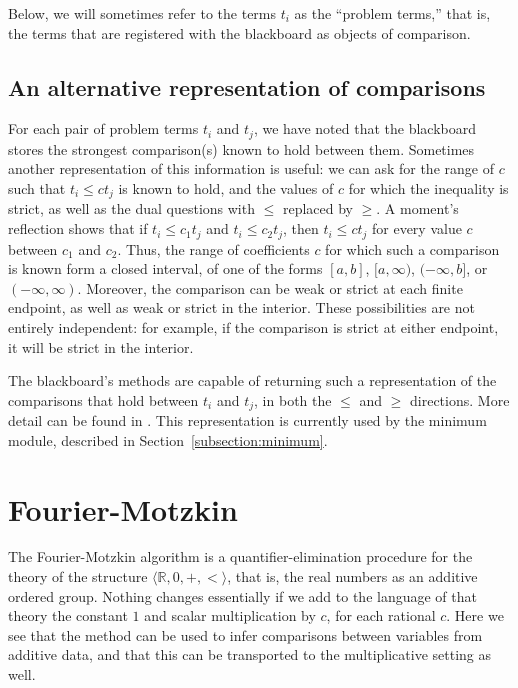 \documentclass[runningheds]{llncs}
\newcommand{\RR}{\mathbb{R}}
\begin{document}
Below, we will sometimes refer to the terms $t_i$ as the ``problem terms,'' that is, the terms that are registered with the blackboard as objects of comparison.

\subsection{An alternative representation of comparisons}
\label{subsection:alternative:representation}

For each pair of problem terms $t_i$ and $t_j$, we have noted that the blackboard stores the strongest comparison(s) known to hold between them. Sometimes another representation of this information is useful: we can ask for the range of $c$ such that $t_i \leq c t_j$ is known to hold, and the values of $c$ for which the inequality is strict, as well as the dual questions with $\le$ replaced by $\ge$. A moment's reflection shows that if $t_i \leq c_1 t_j$ and $t_i \leq c_2 t_j$, then $t_i \leq c t_j$ for every value $c$ between $c_1$ and $c_2$. Thus, the range of coefficients $c$ for which such a comparison is known form a closed interval, of one of the forms $[a, b]$, $[a, \infty)$, $(-\infty, b]$, or $(-\infty, \infty)$. Moreover, the comparison can be weak or strict at each finite endpoint, as well as weak or strict in the interior. These possibilities are not entirely independent: for example, if the comparison is strict at either endpoint, it will be strict in the interior.

The blackboard's methods are capable of returning such a representation of the comparisons that hold between $t_i$ and $t_j$, in both the $\le$ and $\ge$ directions. More detail can be found in \cite{lewis:14}. This representation is currently used by the minimum module, described in Section~\ref{subsection:minimum}. 



\section{Fourier-Motzkin}
\label{section:fourier:motzkin}

The Fourier-Motzkin algorithm \cite{schrijver:86} is a quantifier-elimination procedure for the theory of the structure $\langle \RR, 0, +, < \rangle$, that is, the real numbers as an additive ordered group. Nothing changes essentially if we add to the language of that theory the constant $1$ and scalar multiplication by $c$, for each rational $c$. Here we see that the method can be used to infer comparisons between variables from additive data, and that this can be transported to the multiplicative setting as well.
\end{document}

